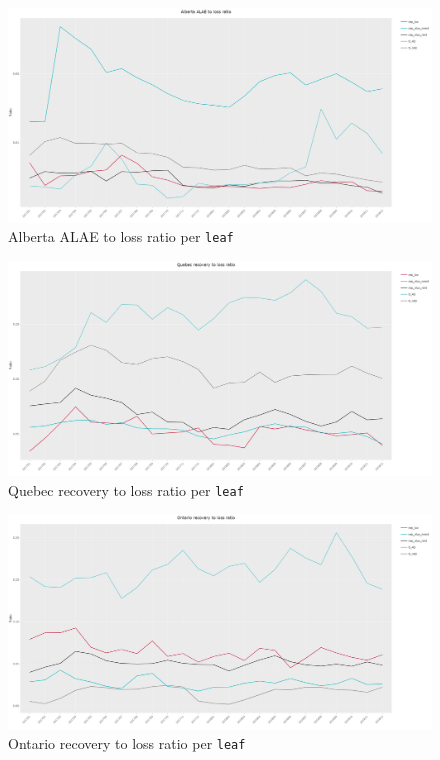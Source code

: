 \begin{figure}[H]
	\begin{center}
		\includegraphics[scale=0.14]{Graphiques/AB_ALAE_loss} 
		\renewcommand{\figurename}{Figure}
		\caption{Alberta ALAE to loss ratio per \texttt{leaf}}\label{Fig_AB_ALAE_loss}
	\end{center}
\end{figure}
\newpage
\begin{figure}[H]
	\begin{center}
		\includegraphics[scale=0.14]{Graphiques/QC_recovery_loss} 
		\renewcommand{\figurename}{Figure}
		\caption{Quebec recovery to loss ratio per \texttt{leaf}}\label{Fig_QC_recovery_loss}
	\end{center}
\end{figure}

\begin{figure}[H]
	\begin{center}
		\includegraphics[scale=0.14]{Graphiques/ON_recovery_loss} 
		\renewcommand{\figurename}{Figure}
		\caption{Ontario recovery to loss ratio per \texttt{leaf}}\label{Fig_ON_recovery_loss}
	\end{center}
\end{figure}

